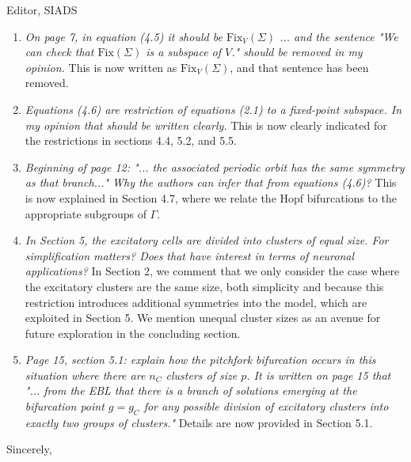 \documentclass[11pt]{letter}
\begin{document}
\begin{letter}{Editor, SIADS}
\begin{enumerate}
\item \emph{On page 7, in equation (4.5) it should be $\textrm{Fix}_V(\Sigma)$ ... and the sentence "We can check that $\textrm{Fix}(\Sigma)$ is a subspace of $V$." should be removed in my opinion. }
This is now written as $\textrm{Fix}_V(\Sigma)$, and that sentence has been removed.
\vspace{4mm} 

\item \emph{Equations (4.6) are restriction of equations (2.1) to a fixed-point subspace. In my opinion that should be written clearly.} This is now clearly indicated for the restrictions in sections 4.4, 5.2, and 5.5.
\vspace{4mm} 

\item \emph{
Beginning of page 12: "... the associated periodic orbit has the same symmetry as that branch..." Why the authors can infer that from equations (4.6)?} This is now explained in Section 4.7, where we relate the Hopf bifurcations to the appropriate subgroups of $\Gamma$.
\vspace{4mm} 

\item \emph{In Section 5, the excitatory cells are divided into clusters of equal size. For simplification matters? Does that have interest in terms of neuronal applications? } In Section 2, we comment that we only consider the case where the excitatory clusters are the same size, both simplicity and because this restriction introduces additional symmetries into the model, which are exploited in Section 5. We mention unequal cluster sizes as an avenue for future exploration in the concluding section.
\vspace{4mm} 

\item \emph{Page 15, section 5.1: explain how the pitchfork bifurcation occurs in this situation where there are $n_C$ clusters of size $p$. It is written on page 15 that "... from the EBL that there is a branch of solutions emerging at the bifurcation point $g = g_C$ for any possible division of excitatory clusters into exactly two groups of clusters." } Details are now provided in Section 5.1.
\vspace{4mm} 

\end{enumerate}


\closing{Sincerely,}

\end{letter}
\end{document}

